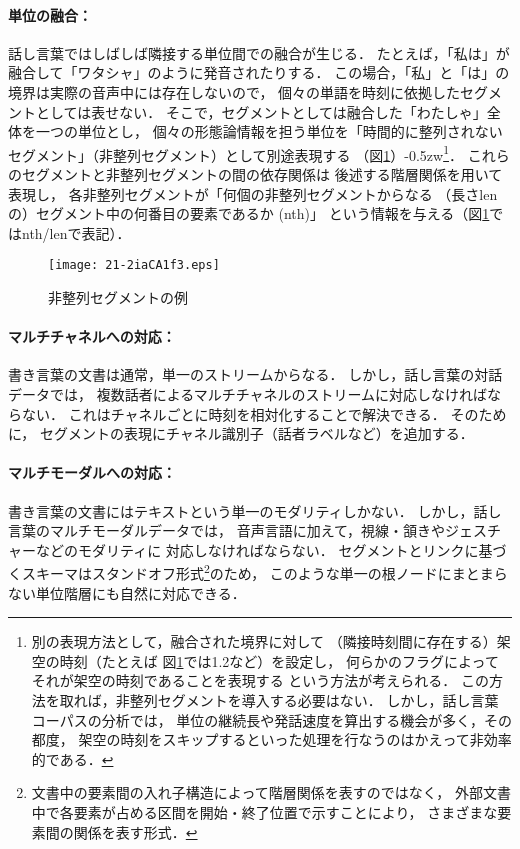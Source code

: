 \documentclass[japanese]{jnlp_1.4}
\begin{document}
\paragraph{単位の融合：}
話し言葉ではしばしば隣接する単位間での融合が生じる．
たとえば，「私は」が融合して「ワタシャ」のように発音されたりする．
\pagebreak
この場合，「私」と「は」の境界は実際の音声中には存在しないので，
個々の単語を時刻に依拠したセグメントとしては表せない．
そこで，セグメントとしては融合した「わたしゃ」全体を一つの単位とし，
個々の形態論情報を担う単位を「時間的に整列されない
セグメント」（非整列セグメント）として別途表現する
（図\ref{fig:subseg}）{\kern-0.5zw}\footnote{
 別の表現方法として，融合された境界に対して
（隣接時刻間に存在する）架空の時刻（たとえば
図\ref{fig:subseg}では1.2など）を設定し，
何らかのフラグによってそれが架空の時刻であることを表現する
という方法が考えられる．
この方法を取れば，非整列セグメントを導入する必要はない．
しかし，話し言葉コーパスの分析では，
単位の継続長や発話速度を算出する機会が多く，その都度，
架空の時刻をスキップするといった処理を行なうのはかえって非効率的である．
}．
これらのセグメントと非整列セグメントの間の依存関係は
後述する階層関係を用いて表現し，
各非整列セグメントが「何個の非整列セグメントからなる
（長さlenの）セグメント中の何番目の要素であるか (nth)」
という情報を与える（図\ref{fig:subseg}ではnth/lenで表記）．

\begin{figure}[t]
\begin{center}
\texttt{[image: 21-2iaCA1f3.eps]}
\end{center}
\caption{非整列セグメントの例}
\label{fig:subseg}
\end{figure}

\paragraph{マルチチャネルへの対応：}

書き言葉の文書は通常，単一のストリームからなる．
しかし，話し言葉の対話データでは，
複数話者によるマルチチャネルのストリームに対応しなければならない．
これはチャネルごとに時刻を相対化することで解決できる．
そのために，
セグメントの表現にチャネル識別子（話者ラベルなど）を追加する．


\paragraph{マルチモーダルへの対応：}

書き言葉の文書にはテキストという単一のモダリティしかない．
しかし，話し言葉のマルチモーダルデータでは，
音声言語に加えて，視線・頷きやジェスチャーなどのモダリティに
対応しなければならない．
セグメントとリンクに基づくスキーマはスタンドオフ形式\footnote{
 文書中の要素間の入れ子構造によって階層関係を表すのではなく，
外部文書中で各要素が占める区間を開始・終了位置で示すことにより，
さまざまな要素間の関係を表す形式．}のため，
このような単一の根ノードにまとまらない単位階層にも自然に対応できる．
\end{document}
